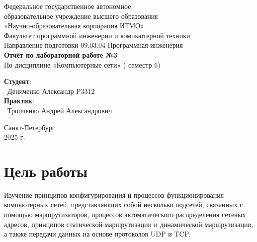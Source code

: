 \documentclass{article}
\begin{document}
\begin{center}
    \Large
    Федеральное государственное автономное \\
    образовательное учреждение высшего образования \\ 
    «Научно-образовательная корпорация ИТМО»\\
    \vspace{0.5cm}
    \large
    Факультет программной инженерии и компьютерной техники \\
    Направление подготовки 09.03.04 Программная инженерия \\
    \vspace{1cm}
    \Large
    \textbf{Отчёт по лабораторной работе №3} \\
        По дисциплине «Компьютерные сети» ( семестр 6)\\
    \large
    \vspace{8cm}

    \begin{minipage}{.33\textwidth}
    \end{minipage}
    \hfill
    \begin{minipage}{.4\textwidth}
    
        \textbf{Студент}: \vspace{.1cm} \\
        \ Дениченко Александр P3312\\
        \textbf{Практик}:  \\
        \ Тропченко Андрей Александрович
    \end{minipage}
    \vfill
Санкт-Петербург\\ 2025 г.
\end{center}
\pagestyle{empty}
\newpage
\pagestyle{plain}

\section*{Цель работы}
Изучение принципов конфигурирования и процессов функционирования
компьютерных сетей, представляющих собой несколько подсетей, связанных с
помощью маршрутизаторов, процессов автоматического распределения сетевых
адресов, принципов статической маршрутизации и динамической маршрутизации, а также передачи данных на основе протоколов UDP и TCP.
\end{document}
